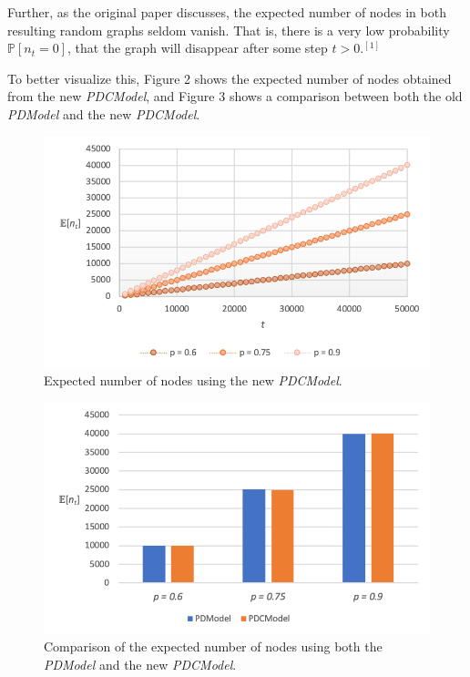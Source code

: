 \documentclass[final,3p,times,twocolumn]{elsarticle}
\begin{document}
Further, as the original paper discusses, the expected number of nodes in both resulting random graphs seldom vanish. That is, there is a very low probability $\mathbb{P}[n_t = 0]$, that the graph will disappear after some step $t > 0$.$^{[1]}$

To better visualize this, Figure 2 shows the expected number of nodes obtained from the new \textit{PDCModel}, and Figure 3 shows a comparison between both the old \textit{PDModel} and the new \textit{PDCModel}.

\begin{figure}[h]
\centering
\includegraphics[width=1\linewidth]{nodes.png}
\caption{Expected number of nodes using the new \textit{PDCModel}.}
\end{figure}

\begin{figure}[h]
\centering
\includegraphics[width=1\linewidth]{nodes-comparison.png}
\caption{Comparison of the expected number of nodes using both the \textit{PDModel} and the new \textit{PDCModel}.}
\end{figure}
\end{document}
